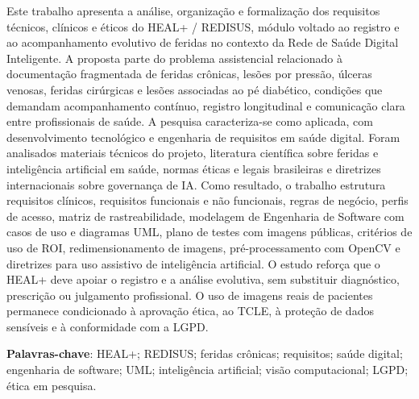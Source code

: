 \documentclass[
    12pt,
    oneside,
    a4paper,
    chapter=TITLE,
    brazil,
    sumario=tradicional,
    hidelinks
]{abntex2}
\renewcommand{\imprimircapa}{%
  \begin{capa}%
    \center
    \normalfont\normalsize
    \imprimirautor

    \vfill
    \begin{center}
      \normalfont\normalsize\bfseries\imprimirtitulo
    \end{center}
    \vfill

    \normalfont\normalsize\imprimirlocal

    \normalfont\normalsize\imprimirdata

    \vspace*{1cm}
  \end{capa}
}
\begin{document}
\imprimircapa
\imprimirfolhaderosto*

\begin{resumo}
Este trabalho apresenta a análise, organização e formalização dos requisitos técnicos, clínicos e éticos do HEAL+ / REDISUS, módulo voltado ao registro e ao acompanhamento evolutivo de feridas no contexto da Rede de Saúde Digital Inteligente. A proposta parte do problema assistencial relacionado à documentação fragmentada de feridas crônicas, lesões por pressão, úlceras venosas, feridas cirúrgicas e lesões associadas ao pé diabético, condições que demandam acompanhamento contínuo, registro longitudinal e comunicação clara entre profissionais de saúde. A pesquisa caracteriza-se como aplicada, com desenvolvimento tecnológico e engenharia de requisitos em saúde digital. Foram analisados materiais técnicos do projeto, literatura científica sobre feridas e inteligência artificial em saúde, normas éticas e legais brasileiras e diretrizes internacionais sobre governança de IA. Como resultado, o trabalho estrutura requisitos clínicos, requisitos funcionais e não funcionais, regras de negócio, perfis de acesso, matriz de rastreabilidade, modelagem de Engenharia de Software com casos de uso e diagramas UML, plano de testes com imagens públicas, critérios de uso de ROI, redimensionamento de imagens, pré-processamento com OpenCV e diretrizes para uso assistivo de inteligência artificial. O estudo reforça que o HEAL+ deve apoiar o registro e a análise evolutiva, sem substituir diagnóstico, prescrição ou julgamento profissional. O uso de imagens reais de pacientes permanece condicionado à aprovação ética, ao TCLE, à proteção de dados sensíveis e à conformidade com a LGPD.

\textbf{Palavras-chave}: HEAL+; REDISUS; feridas crônicas; requisitos; saúde digital; engenharia de software; UML; inteligência artificial; visão computacional; LGPD; ética em pesquisa.
\end{resumo}
\end{document}
